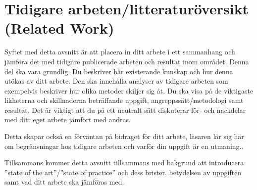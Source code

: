 \section{Tidigare arbeten/litteraturöversikt (Related Work)}

Syftet med detta avsnitt \"{a}r att placera in ditt arbete i ett sammanhang och j\"{a}mf\"{o}ra det med tidigare publicerade arbeten och resultat inom omr\r{a}det. Denna del ska vara grundlig. Du beskriver h\"{a}r existerande kunskap och hur denna ut\"{o}kas av ditt arbete. Den ska inneh\r{a}lla analyser av tidigare arbeten som exempelvis beskriver hur olika metoder skiljer sig \r{a}t. Du ska visa p\r{a} de viktigaste likheterna och skillnaderna betr\"{a}ffande uppgift, angreppss\"{a}tt/metodologi samt resultat. Det \"{a}r viktigt att du p\r{a} ett neutralt s\"{a}tt diskuterar f\"{o}r- och nackdelar med ditt eget arbete j\"{a}mf\"{o}rt med andras.

Detta skapar ocks\r{a} en f\"{o}rv\"{a}ntan p\r{a} bidraget f\"{o}r ditt arbete, l\"{a}saren l\"{a}r sig h\"{a}r om begr\"{a}nsningar hos tidigare arbeten och varf\"{o}r din uppgift \"{a}r en utmaning.. 

Tillsammans kommer detta avsnitt tillsammans med bakgrund att introducera ”state of the art”/”state of practice” och dess brister, betydelsen av uppgiften samt vad ditt arbete ska j\"{a}mf\"{o}ras med.

